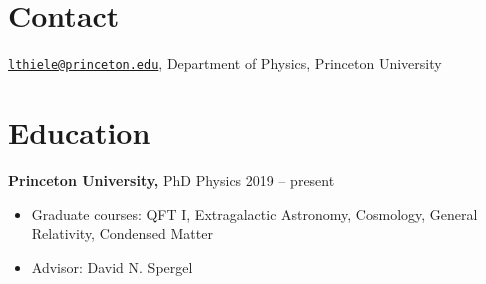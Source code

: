 \documentclass[margin]{res}
\begin{document}
 

\vspace*{0.8cm}


\begin{resume} 


\vspace*{-0.5cm}
\section{Contact}
\href{mailto:lthiele@princeton.edu}{\texttt{lthiele@princeton.edu}}, Department of Physics, Princeton University



\section{Education}
	{\bf Princeton University,} PhD Physics \hfill 2019 -- present
	\begin{itemize} \itemsep -2pt
		\item Graduate courses: QFT I, Extragalactic Astronomy,
		Cosmology, General Relativity, Condensed Matter
		\item Advisor: David N. Spergel
	\end{itemize}
	

\end{resume}
\end{document}

